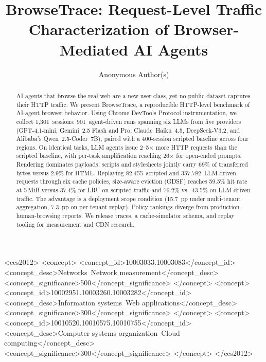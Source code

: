 \documentclass[10pt,sigconf,letterpaper,anonymous,nonacm]{acmart}
\newcommand{\sysname}{Browse\-Trace\xspace}
\newcommand{\submissioninfo}{Paper \#85, 13 pages body, 16 pages total}
\begin{document}
\pagestyle{plain}  %

\title{BrowseTrace: Request-Level Traffic Characterization of Browser-Mediated AI Agents}
\author{Anonymous Author(s)}
\makeatletter
\gdef\addresses{\@author{\submissioninfo}}
\gdef\authors{Anonymous Author(s)}
\makeatother

\begin{CCSXML}
<ccs2012>
<concept>
<concept_id>10003033.10003083</concept_id>
<concept_desc>Networks~Network measurement</concept_desc>
<concept_significance>500</concept_significance>
</concept>
<concept>
<concept_id>10002951.10003260.10003282</concept_id>
<concept_desc>Information systems~Web applications</concept_desc>
<concept_significance>300</concept_significance>
</concept>
<concept>
<concept_id>10010520.10010575.10010755</concept_id>
<concept_desc>Computer systems organization~Cloud computing</concept_desc>
<concept_significance>300</concept_significance>
</concept>
</ccs2012>
\end{CCSXML}



\begin{abstract}
AI agents that browse the real web are a new user class, yet no
public dataset captures their HTTP traffic.  We present \sysname, a
reproducible HTTP-level benchmark of AI-agent browser behavior.
Using Chrome DevTools Protocol instrumentation, we collect
1{,}301~sessions: 901~agent-driven runs spanning six LLMs from five
providers (GPT-4.1-mini, Gemini~2.5 Flash and Pro, Claude~Haiku~4.5,
DeepSeek-V3.2, and Alibaba's Qwen~2.5-Coder~7B), paired with a
400-session scripted baseline across four regions.  On identical
tasks, LLM agents issue 2--5$\times$ more HTTP requests than the
scripted baseline, with per-task amplification reaching 26$\times$
for open-ended prompts.  Rendering dominates payloads: scripts and
stylesheets jointly carry 69\% of transferred bytes versus 2.9\% for HTML.
Replaying 82{,}455~scripted and 357{,}782~LLM-driven requests
through six cache policies, size-aware eviction (GDSF) reaches
59.5\% hit rate at 5\,MiB versus 37.4\% for LRU on scripted traffic
and 76.2\% vs.\ 43.5\% on LLM-driven traffic.  The advantage is a
deployment scope condition (15.7~pp under multi-tenant
aggregation, 7.3~pp on per-tenant replay).  Policy rankings
diverge from production human-browsing reports.  We release traces, a
cache-simulator schema, and replay tooling for measurement and CDN
research.
\end{abstract}
\end{document}
